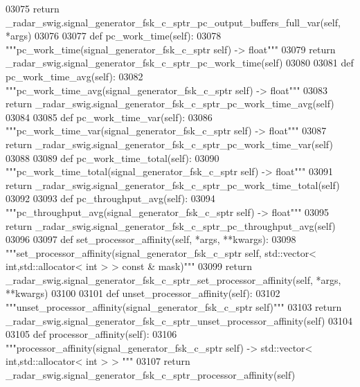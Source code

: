 \begin{DoxyCode}
{{{{{{{{{{{03075         \textcolor{keywordflow}{return} \_radar\_swig.signal\_generator\_fsk\_c\_sptr\_pc\_output\_buffers\_full\_var(self, *args)
03076 
03077     \textcolor{keyword}{def }pc_work_time(self):
03078         \textcolor{stringliteral}{"""pc\_work\_time(signal\_generator\_fsk\_c\_sptr self) -> float"""}
03079         \textcolor{keywordflow}{return} \_radar\_swig.signal\_generator\_fsk\_c\_sptr\_pc\_work\_time(self)
03080 
03081     \textcolor{keyword}{def }pc_work_time_avg(self):
03082         \textcolor{stringliteral}{"""pc\_work\_time\_avg(signal\_generator\_fsk\_c\_sptr self) -> float"""}
03083         \textcolor{keywordflow}{return} \_radar\_swig.signal\_generator\_fsk\_c\_sptr\_pc\_work\_time\_avg(self)
03084 
03085     \textcolor{keyword}{def }pc_work_time_var(self):
03086         \textcolor{stringliteral}{"""pc\_work\_time\_var(signal\_generator\_fsk\_c\_sptr self) -> float"""}
03087         \textcolor{keywordflow}{return} \_radar\_swig.signal\_generator\_fsk\_c\_sptr\_pc\_work\_time\_var(self)
03088 
03089     \textcolor{keyword}{def }pc_work_time_total(self):
03090         \textcolor{stringliteral}{"""pc\_work\_time\_total(signal\_generator\_fsk\_c\_sptr self) -> float"""}
03091         \textcolor{keywordflow}{return} \_radar\_swig.signal\_generator\_fsk\_c\_sptr\_pc\_work\_time\_total(self)
03092 
03093     \textcolor{keyword}{def }pc_throughput_avg(self):
03094         \textcolor{stringliteral}{"""pc\_throughput\_avg(signal\_generator\_fsk\_c\_sptr self) -> float"""}
03095         \textcolor{keywordflow}{return} \_radar\_swig.signal\_generator\_fsk\_c\_sptr\_pc\_throughput\_avg(self)
03096 
03097     \textcolor{keyword}{def }set_processor_affinity(self, *args, **kwargs):
03098         \textcolor{stringliteral}{"""set\_processor\_affinity(signal\_generator\_fsk\_c\_sptr self, std::vector< int,std::allocator< int >
       > const & mask)"""}
03099         \textcolor{keywordflow}{return} \_radar\_swig.signal\_generator\_fsk\_c\_sptr\_set\_processor\_affinity(self, *args, **kwargs)
03100 
03101     \textcolor{keyword}{def }unset_processor_affinity(self):
03102         \textcolor{stringliteral}{"""unset\_processor\_affinity(signal\_generator\_fsk\_c\_sptr self)"""}
03103         \textcolor{keywordflow}{return} \_radar\_swig.signal\_generator\_fsk\_c\_sptr\_unset\_processor\_affinity(self)
03104 
03105     \textcolor{keyword}{def }processor_affinity(self):
03106         \textcolor{stringliteral}{"""processor\_affinity(signal\_generator\_fsk\_c\_sptr self) -> std::vector< int,std::allocator< int > >
      """}
03107         \textcolor{keywordflow}{return} \_radar\_swig.signal\_generator\_fsk\_c\_sptr\_processor\_affinity(self)
}}}}}}}}}}}
\end{DoxyCode}
